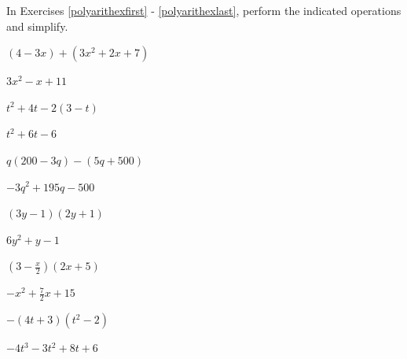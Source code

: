 \documentclass{ximera}
\begin{document}
	\author{Stitz-Zeager}



\label{ExercisesforAppPolyArith}

\begin{question}
In Exercises \ref{polyarithexfirst} - \ref{polyarithexlast}, perform the indicated operations and simplify.

\begin{problem}\label{polyarithexfirst}
$(4-3x) + (3x^2 + 2x + 7)$

\begin{solution}
     $3x^2 - x + 11$
\end{solution}
\end{problem}

\begin{problem}
$t^2 + 4t - 2(3-t)$

\begin{solution}
    $t^2 + 6t-6$
\end{solution}
\end{problem}

\begin{problem}
$q(200-3q) - (5q + 500)$

\begin{solution}
     $-3q^2+195q-500$
\end{solution}
\end{problem}

\begin{problem}
$(3y-1)(2y+1)$

\begin{solution}
    $6y^2+y-1$
\end{solution}
\end{problem}

\begin{problem}
$\left(3-\frac{x}{2}\right)(2x+5)$

\begin{solution}
    $-x^2 + \frac{7}{2} x + 15$
\end{solution}
\end{problem}

\begin{problem}
$-(4t+3)(t^2-2)$

\begin{solution}
    $-4t^3-3t^2+8t+6$
\end{solution}
\end{problem}


\end{question}
\end{document}
